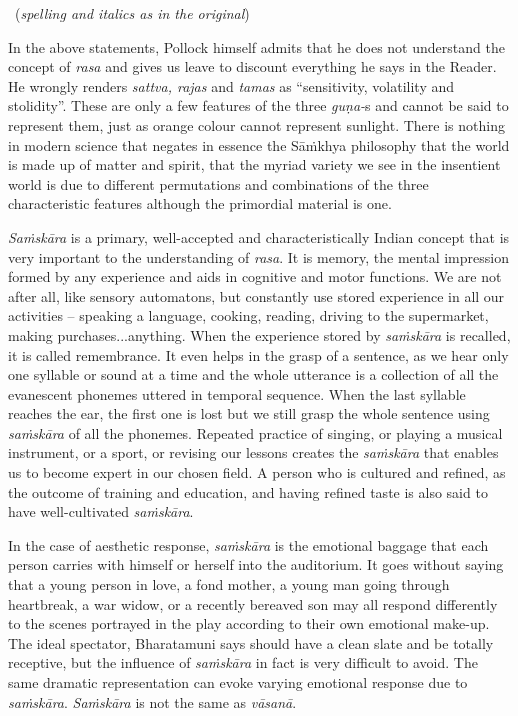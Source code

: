 \vspace{-.2cm}

\begin{myquote}

~\hfill (\textit{spelling and italics as in the original})
\end{myquote}

In the above statements, Pollock himself admits that he does not understand the concept of \textit{rasa }and gives us leave to discount everything he says in the Reader. He wrongly renders \textit{sattva, rajas} and \textit{tamas} as “sensitivity, volatility and stolidity”. These are only a few features of the three \textit{guṇa-}s and cannot be said to represent them, just as orange colour cannot represent sunlight. There is nothing in modern science that negates in essence the Sāṁkhya philosophy that the world is made up of matter and spirit, that the myriad variety we see in the insentient world is due to different permutations and combinations of the three characteristic features although the primordial material is one.

\eject

\textit{Saṁskāra} is a primary, well-accepted and characteristically Indian concept that is very important to the understanding of \textit{rasa}. It is memory, the mental impression formed by any experience and aids in cognitive and motor functions. We are not after all, like sensory automatons, but constantly use stored experience in all our activities – speaking a language, cooking, reading, driving to the supermarket, making purchases...anything. When the experience stored by \textit{saṁskāra} is recalled, it is called remembrance. It even helps in the grasp of a sentence, as we hear only one syllable or sound at a time and the whole utterance is a collection of all the evanescent phonemes uttered in temporal sequence. When the last syllable reaches the ear, the first one is lost but we still grasp the whole sentence using \textit{saṁskāra} of all the phonemes. Repeated practice of singing, or playing a musical instrument, or a sport, or revising our lessons creates the \textit{saṁskāra} that enables us to become expert in our chosen field. A person who is cultured and refined, as the outcome of training and education, and having refined taste is also said to have well-cultivated \textit{saṁskāra}.

In the case of aesthetic response, \textit{saṁskāra} is the emotional baggage that each person carries with himself or herself into the auditorium. It goes without saying that a young person in love, a fond mother, a young man going through heartbreak, a war widow, or a recently bereaved son may all respond differently to the scenes portrayed in the play according to their own emotional make-up. The ideal spectator, Bharatamuni says should have a clean slate and be totally receptive, but the influence of \textit{saṁskāra} in fact is very difficult to avoid. The same dramatic representation can evoke varying emotional response due to \textit{saṁskāra}. \textit{Saṁskāra} is not the same as \textit{vāsanā}.

